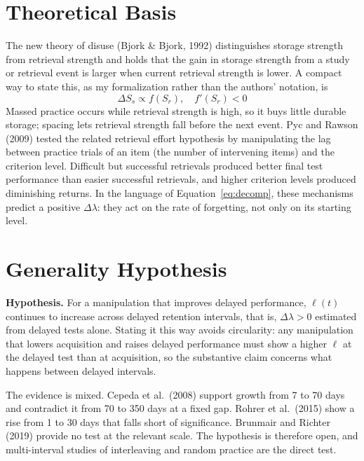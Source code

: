 \documentclass[10pt,twocolumn]{article}
\newcommand{\lr}{\ell}
\begin{document}
\section{Theoretical Basis}

The new theory of disuse (Bjork \& Bjork, 1992) distinguishes storage strength from retrieval strength and holds that the gain in storage strength from a study or retrieval event is larger when current retrieval strength is lower. A compact way to state this, as my formalization rather than the authors' notation, is
\begin{equation}
\Delta S_s \propto f(S_r), \quad f'(S_r) < 0
\label{eq:storage}
\end{equation}
Massed practice occurs while retrieval strength is high, so it buys little durable storage; spacing lets retrieval strength fall before the next event. Pyc and Rawson (2009) tested the related retrieval effort hypothesis by manipulating the lag between practice trials of an item (the number of intervening items) and the criterion level. Difficult but successful retrievals produced better final test performance than easier successful retrievals, and higher criterion levels produced diminishing returns. In the language of Equation~\ref{eq:decomp}, these mechanisms predict a positive $\Delta\lambda$: they act on the rate of forgetting, not only on its starting level.

\section{Generality Hypothesis}
\label{sec:hypothesis}

\textbf{Hypothesis.} For a manipulation that improves delayed performance, $\lr(t)$ continues to increase across delayed retention intervals, that is, $\Delta\lambda > 0$ estimated from delayed tests alone. Stating it this way avoids circularity: any manipulation that lowers acquisition and raises delayed performance must show a higher $\lr$ at the delayed test than at acquisition, so the substantive claim concerns what happens between delayed intervals.

The evidence is mixed. Cepeda et al.\ (2008) support growth from 7 to 70 days and contradict it from 70 to 350 days at a fixed gap. Rohrer et al.\ (2015) show a rise from 1 to 30 days that falls short of significance. Brunmair and Richter (2019) provide no test at the relevant scale. The hypothesis is therefore open, and multi-interval studies of interleaving and random practice are the direct test.
\end{document}
